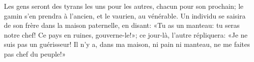 Les gens seront des tyrans les uns pour les autres, chacun pour son prochain;
	le gamin s’en prendra à l’ancien, et le vaurien, au vénérable.
Un individu se saisira de son frère dans la maison paternelle, en disant:
	«Tu as un manteau: tu seras notre chef!
	Ce pays en ruines, gouverne-le!»;
ce jour-là, l’autre répliquera:
	«Je ne suis pas un guérisseur!
	Il n’y a, dans ma maison, ni pain ni manteau,
	ne me faites pas chef du peuple!»
